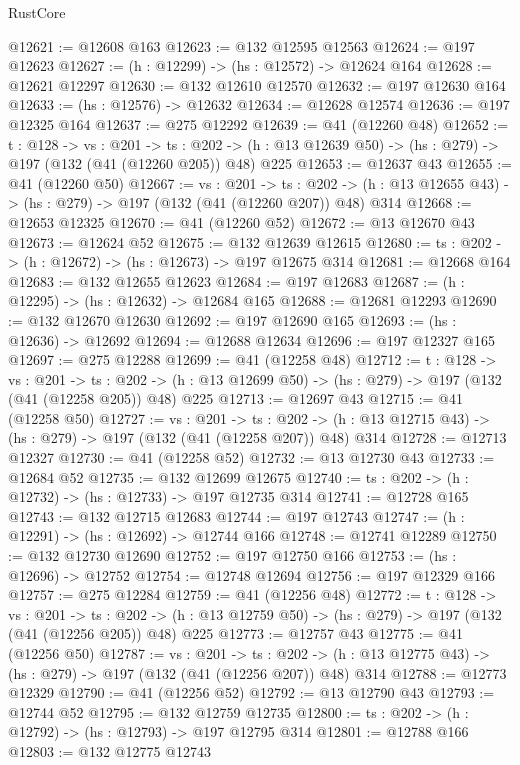\begin{lexlean}{RustCore}
\begin{coremodule}
@12621 := @12608 @163
@12623 := @132 @12595 @12563
@12624 := @197 @12623
@12627 := (h : @12299) -> (hs : @12572) -> @12624 @164
@12628 := @12621 @12297
@12630 := @132 @12610 @12570
@12632 := @197 @12630 @164
@12633 := (hs : @12576) -> @12632
@12634 := @12628 @12574
@12636 := @197 @12325 @164
@12637 := @275 @12292
@12639 := @41 (@12260 @48)
@12652 := {t : @128} ->
  {vs : @201} ->
  {ts : @202} -> (h : @13 @12639 @50) -> (hs : @279) -> @197 (@132 (@41 (@12260 @205)) @48) @225
@12653 := @12637 @43
@12655 := @41 (@12260 @50)
@12667 := {vs : @201} ->
  {ts : @202} -> (h : @13 @12655 @43) -> (hs : @279) -> @197 (@132 (@41 (@12260 @207)) @48) @314
@12668 := @12653 @12325
@12670 := @41 (@12260 @52)
@12672 := @13 @12670 @43
@12673 := @12624 @52
@12675 := @132 @12639 @12615
@12680 := {ts : @202} -> (h : @12672) -> (hs : @12673) -> @197 @12675 @314
@12681 := @12668 @164
@12683 := @132 @12655 @12623
@12684 := @197 @12683
@12687 := (h : @12295) -> (hs : @12632) -> @12684 @165
@12688 := @12681 @12293
@12690 := @132 @12670 @12630
@12692 := @197 @12690 @165
@12693 := (hs : @12636) -> @12692
@12694 := @12688 @12634
@12696 := @197 @12327 @165
@12697 := @275 @12288
@12699 := @41 (@12258 @48)
@12712 := {t : @128} ->
  {vs : @201} ->
  {ts : @202} -> (h : @13 @12699 @50) -> (hs : @279) -> @197 (@132 (@41 (@12258 @205)) @48) @225
@12713 := @12697 @43
@12715 := @41 (@12258 @50)
@12727 := {vs : @201} ->
  {ts : @202} -> (h : @13 @12715 @43) -> (hs : @279) -> @197 (@132 (@41 (@12258 @207)) @48) @314
@12728 := @12713 @12327
@12730 := @41 (@12258 @52)
@12732 := @13 @12730 @43
@12733 := @12684 @52
@12735 := @132 @12699 @12675
@12740 := {ts : @202} -> (h : @12732) -> (hs : @12733) -> @197 @12735 @314
@12741 := @12728 @165
@12743 := @132 @12715 @12683
@12744 := @197 @12743
@12747 := (h : @12291) -> (hs : @12692) -> @12744 @166
@12748 := @12741 @12289
@12750 := @132 @12730 @12690
@12752 := @197 @12750 @166
@12753 := (hs : @12696) -> @12752
@12754 := @12748 @12694
@12756 := @197 @12329 @166
@12757 := @275 @12284
@12759 := @41 (@12256 @48)
@12772 := {t : @128} ->
  {vs : @201} ->
  {ts : @202} -> (h : @13 @12759 @50) -> (hs : @279) -> @197 (@132 (@41 (@12256 @205)) @48) @225
@12773 := @12757 @43
@12775 := @41 (@12256 @50)
@12787 := {vs : @201} ->
  {ts : @202} -> (h : @13 @12775 @43) -> (hs : @279) -> @197 (@132 (@41 (@12256 @207)) @48) @314
@12788 := @12773 @12329
@12790 := @41 (@12256 @52)
@12792 := @13 @12790 @43
@12793 := @12744 @52
@12795 := @132 @12759 @12735
@12800 := {ts : @202} -> (h : @12792) -> (hs : @12793) -> @197 @12795 @314
@12801 := @12788 @166
@12803 := @132 @12775 @12743

\end{coremodule}
\end{lexlean}
